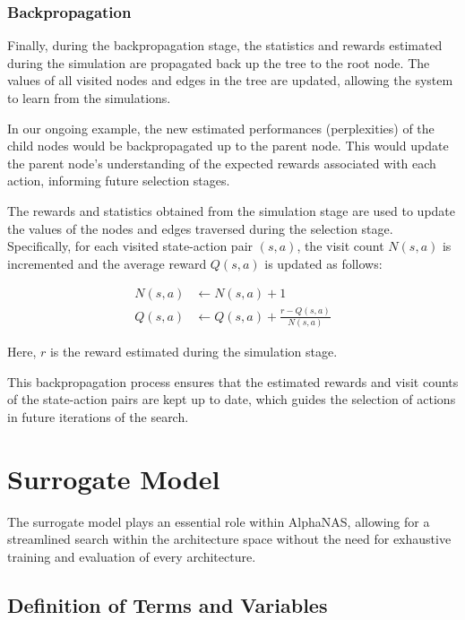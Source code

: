 \documentclass{article}
\begin{document}
\subsubsection{Backpropagation}
Finally, during the backpropagation stage, the statistics and rewards estimated during the simulation are propagated back up the tree to the root node. The values of all visited nodes and edges in the tree are updated, allowing the system to learn from the simulations.

In our ongoing example, the new estimated performances (perplexities) of the child nodes would be backpropagated up to the parent node. This would update the parent node's understanding of the expected rewards associated with each action, informing future selection stages.

The rewards and statistics obtained from the simulation stage are used to update the values of the nodes and edges traversed during the selection stage. Specifically, for each visited state-action pair $(s, a)$, the visit count $N(s, a)$ is incremented and the average reward $Q(s, a)$ is updated as follows:

\begin{align*}
N(s, a) &\gets N(s, a) + 1 \\
Q(s, a) &\gets Q(s, a) + \frac{r - Q(s, a)}{N(s, a)}
\end{align*}

Here, $r$ is the reward estimated during the simulation stage.

This backpropagation process ensures that the estimated rewards and visit counts of the state-action pairs are kept up to date, which guides the selection of actions in future iterations of the search.

\section{Surrogate Model}
\label{sec:surrogate}

The surrogate model plays an essential role within AlphaNAS, allowing for a streamlined search within the architecture space without the need for exhaustive training and evaluation of every architecture.

\subsection{Definition of Terms and Variables}
\end{document}
